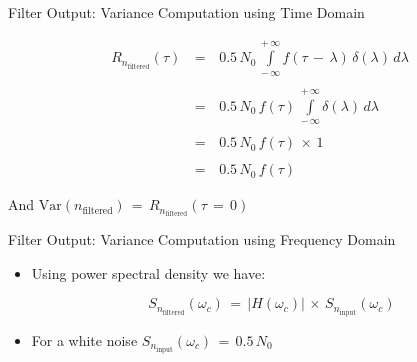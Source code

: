 \documentclass{Beamer}
\begin{document}
\begin{frame}[t,allowframebreaks]{Filter Output: Variance Computation using Time Domain}
\begin{itemize}
\newpage

\begin{equation}
\begin{array}{rcl}
R_{n_{\text{filtered}}}(\tau) \, &=& \, 0.5 \,  N_0 \, \displaystyle\int\limits_{- \, \infty}^{+ \, \infty} f (\tau \, - \, \lambda)  \, \delta(\lambda) \, d\lambda \\  \\
 &=& \, 0.5 \,  N_0 \, f (\tau)\, \displaystyle\int\limits_{- \, \infty}^{+ \, \infty}  \delta(\lambda) \, d\lambda \\  \\
 &=& \, 0.5 \,  N_0 \, f (\tau)\, \times \, 1 \\ \\
 &=& \, 0.5 \,  N_0 \, f (\tau)
\end{array}
\end{equation}

And $\text{Var}(n_{\text{filtered}}) \, = \, R_{n_{\text{filtered}}}(\tau \, = \, 0)$

\end{itemize}

\end{frame}

\begin{frame}[t]{Filter Output: Variance Computation using Frequency Domain}

\begin{itemize}

\item Using power spectral density we have:

\begin{equation}
S_{n_{\text{filtered}}}(\omega_c) \, = \, |H(\omega_c)| \, \times \, S_{n_{\text{input}}}(\omega_c)
\end{equation}

\item For a white noise $S_{n_{\text{input}}}(\omega_c) \, = \, 0.5 \, N_0$

\end{itemize}

\end{frame}
\end{document}
